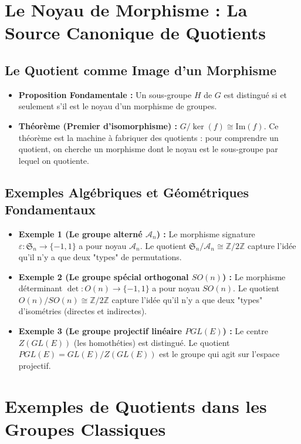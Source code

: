 \documentclass[12pt, a4paper, parskip=full]{report}
\theoremstyle{agregstyle}
\begin{document}
\section{Le Noyau de Morphisme : La Source Canonique de Quotients}

\subsection{Le Quotient comme Image d'un Morphisme}
\begin{itemize}
    \item \textbf{Proposition Fondamentale :} Un sous-groupe $H$ de $G$ est distingué si et seulement s'il est le noyau d'un morphisme de groupes.
    \item \textbf{Théorème (Premier d'isomorphisme) :} $G/\ker(f) \cong \mathrm{Im}(f)$. Ce théorème est la machine à fabriquer des quotients : pour comprendre un quotient, on cherche un morphisme dont le noyau est le sous-groupe par lequel on quotiente.
\end{itemize}

\subsection{Exemples Algébriques et Géométriques Fondamentaux}
\begin{itemize}
    \item \textbf{Exemple 1 (Le groupe alterné $\mathcal{A}_n$) :} Le morphisme signature $\varepsilon: \mathfrak{S}_n \to \{-1, 1\}$ a pour noyau $\mathcal{A}_n$. Le quotient $\mathfrak{S}_n / \mathcal{A}_n \cong \mathbb{Z}/2\mathbb{Z}$ capture l'idée qu'il n'y a que deux "types" de permutations.
    \item \textbf{Exemple 2 (Le groupe spécial orthogonal $SO(n)$) :} Le morphisme déterminant $\det: O(n) \to \{-1, 1\}$ a pour noyau $SO(n)$. Le quotient $O(n)/SO(n) \cong \mathbb{Z}/2\mathbb{Z}$ capture l'idée qu'il n'y a que deux "types" d'isométries (directes et indirectes).
    \item \textbf{Exemple 3 (Le groupe projectif linéaire $PGL(E)$) :} Le centre $Z(GL(E))$ (les homothéties) est distingué. Le quotient $PGL(E) = GL(E)/Z(GL(E))$ est le groupe qui agit sur l'espace projectif.
\end{itemize}

\section{Exemples de Quotients dans les Groupes Classiques}
\end{document}
